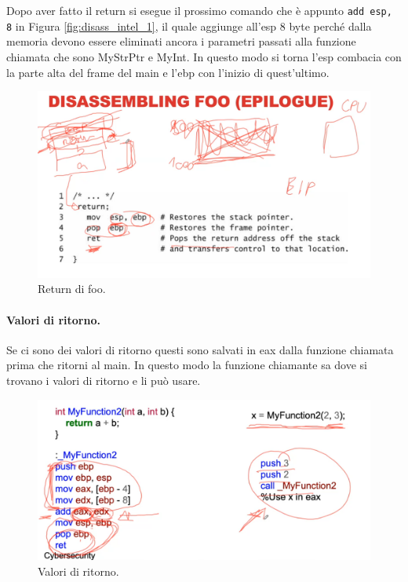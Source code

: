 Dopo aver fatto il return si esegue il prossimo comando che è appunto \verb|add esp, 8| in Figura \ref{fig:disass_intel_1}, il quale aggiunge all'esp 8 byte perché dalla memoria devono essere eliminati ancora i parametri passati alla funzione chiamata che sono MyStrPtr e MyInt. In questo modo si torna l'esp combacia con la parte alta del frame del main e l'ebp con l'inizio di quest'ultimo.
\begin{figure}[H]
    \centering
    \includegraphics[width=13cm, keepaspectratio]{capitoli/secure_coding/img/cap_2/disass_intel_3.png}
    \caption{Return di foo.}\label{fig:disass_intel_3}
\end{figure}

\paragraph{Valori di ritorno.} Se ci sono dei valori di ritorno questi sono salvati in eax dalla funzione chiamata prima che ritorni al main. In questo modo la funzione chiamante sa dove si trovano i valori di ritorno e li può usare.
\begin{figure}[H]
    \centering
    \includegraphics[width=13cm, keepaspectratio]{capitoli/secure_coding/img/cap_2/return_values.png}
    \caption{Valori di ritorno.}\label{fig:ret_values}
\end{figure}

